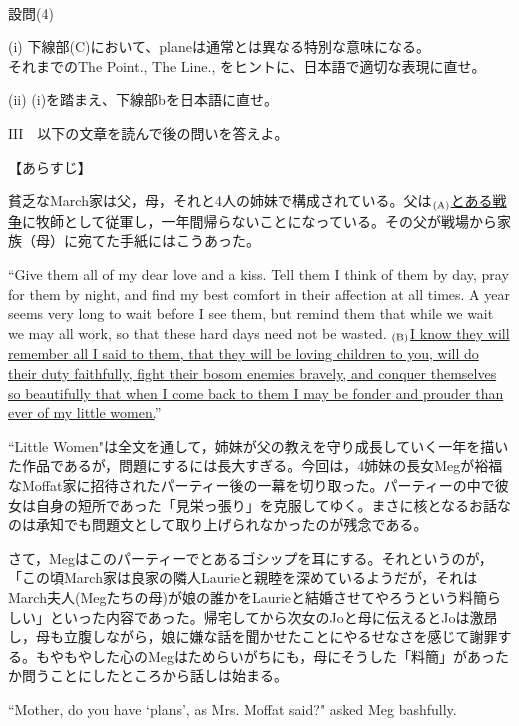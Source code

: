 \documentclass[12pt,a4paper,dvipdfmx]{jarticle}
\begin{document}
\begin{spacing}{1.5}
\

設問(4)　

(i) 下線部(C)において、planeは通常とは異なる特別な意味になる。\\
\hspace{10mm}それまでのThe Point., The Line., をヒントに、日本語で適切な表現に直せ。

(ii) (i)を踏まえ、下線部bを日本語に直せ。


\newpage


{\Large\textbf{$\mathrm{III}$}}　以下の文章を読んで後の問いを答えよ。

\vspace{7mm}

【あらすじ】

貧乏なMarch家は父，母，それと4人の姉妹で構成されている。父は$_{\rm(A)}$\underline{とある戦争}に牧師として従軍し，一年間帰らないことになっている。その父が戦場から家族（母）に宛てた手紙にはこうあった。

“Give them all of my dear love and a kiss. Tell them I think of them by day, pray for them by night, and find my best comfort in their affection at all times. A year seems very long to wait before I see them, but remind them that while we wait we may all work, so that these hard days need not be wasted. $_{\rm(B)}$\ul{I know they will remember all I said to them, that they will be loving children to you, will do their duty faithfully, fight their bosom enemies bravely, and conquer themselves so beautifully that when I come back to them I may be fonder and prouder than ever of my little women.}”

``Little Women"は全文を通して，姉妹が父の教えを守り成長していく一年を描いた作品であるが，問題にするには長大すぎる。今回は，4姉妹の長女Megが裕福なMoffat家に招待されたパーティー後の一幕を切り取った。パーティーの中で彼女は自身の短所であった「見栄っ張り」を克服してゆく。まさに核となるお話なのは承知でも問題文として取り上げられなかったのが残念である。

さて，Megはこのパーティーでとあるゴシップを耳にする。それというのが，「この頃March家は良家の隣人Laurieと親睦を深めているようだが，それはMarch夫人(Megたちの母)が娘の誰かをLaurieと結婚させてやろうという料簡らしい」といった内容であった。帰宅してから次女のJoと母に伝えるとJoは激昂し，母も立腹しながら，娘に嫌な話を聞かせたことにやるせなさを感じて謝罪する。もやもやした心のMegはためらいがちにも，母にそうした「料簡」があったか問うことにしたところから話しは始まる。

\newpage

``Mother, do you have `plans', as Mrs. Moffat said?" asked Meg bashfully.


\end{spacing}
\end{document}
